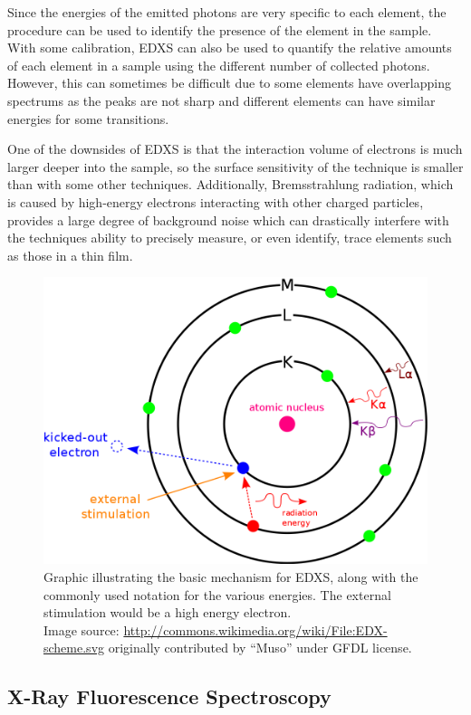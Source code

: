 Since the energies of the emitted photons are very specific to each element, the procedure can be used to identify the presence of the element in the sample. With some calibration, EDXS can also be used to quantify the relative amounts of each element in a sample using the different number of collected photons. However, this can sometimes be difficult due to some elements have overlapping spectrums as the peaks are not sharp and different elements can have similar energies for some transitions.\cite{goldstein_EDS_2003} 

One of the downsides of EDXS is that the interaction volume of electrons is much larger deeper into the sample, so the surface sensitivity of the technique is smaller than with some other techniques. Additionally, Bremsstrahlung radiation, which is caused by high-energy electrons interacting with other charged particles, provides a large degree of background noise which can drastically interfere with the techniques ability to precisely measure, or even identify, trace elements such as those in a thin film.\cite{goldstein_EDS_2003}

\begin{figure}[tb]
   \centering
   \includegraphics[width=0.66\linewidth]{./figures/characterization/EDXS-scheme} 
   \caption[Illustration of EDXS principle]%
   		{Graphic illustrating the basic mechanism for EDXS, along with the commonly used %
		notation for the various energies. The external stimulation would be a high energy %
		electron. \\{\tiny Image source: \url{http://commons.wikimedia.org/wiki/File:EDX-scheme.svg} originally %
		contributed by ``Muso'' under GFDL license.}}
   \label{fig:EDXS-image}
\end{figure}




\subsection{X-Ray Fluorescence Spectroscopy}

